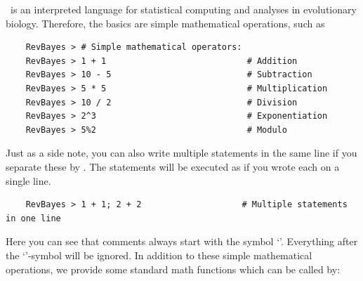 \Rev~is an interpreted language for statistical computing and analyses in evolutionary biology. Therefore, the basics are simple mathematical operations, such as 
{\tt \begin{snugshade*}
\begin{lstlisting}    
    RevBayes > # Simple mathematical operators:
    RevBayes > 1 + 1                            # Addition
    RevBayes > 10 - 5                           # Subtraction
    RevBayes > 5 * 5                            # Multiplication
    RevBayes > 10 / 2                           # Division
    RevBayes > 2^3                              # Exponentiation
    RevBayes > 5%2                              # Modulo
\end{lstlisting}
\end{snugshade*}}
Just as a side note, you can also write multiple statements in the same line if you separate these by \cl{;}.
The statements will be executed as if you wrote each on a single line.
{\tt \begin{snugshade*}
\begin{lstlisting}    
    RevBayes > 1 + 1; 2 + 2                    # Multiple statements in one line
\end{lstlisting}
\end{snugshade*}}
    
Here you can see that comments always start with the symbol `\cl{\#}'. 
Everything after the `\cl{\#}'-symbol will be ignored.
In addition to these simple mathematical operations, we provide some standard math functions which can be called by:
    

